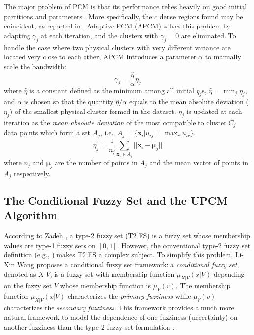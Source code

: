 \documentclass[journal]{IEEEtran}
\theoremstyle{definition}
\begin{document}
The major problem of PCM is that its performance relies heavily on good initial partitions and parameters \cite{nasraoui_improved_1996}. More specifically, the $c$ dense regions found may be coincident, as reported in \cite{barni_comments_1996}. Adaptive PCM (APCM) \cite{xenaki_novel_2016} solves this problem by adapting $\gamma_j$ at each iteration, and the clusters with $\gamma_j=0$ are eliminated. To handle the case where two physical clusters with very different variance are located very close to each other, APCM introduces a parameter $\alpha$ to manually scale the bandwidth:
\begin{equation}
\label{corrected_eta}
\gamma_j=\frac{\hat{\eta}}{\alpha}\eta_j
\end{equation}
where $\hat{\eta}$ is a constant defined as the minimum among all initial $\eta_j\text{s}$, $\hat{\eta}=\min_j\eta_j$, and $\alpha$ is chosen so that the quantity $\hat{\eta}/\alpha$ equals to the mean absolute deviation ($\eta_j$)  of the smallest physical cluster formed in the dataset.
$\eta_j$ is updated at each iteration as the \emph{mean absolute deviation} of the most compatible to cluster $C_j$ data points which form a set $A_j$, i.e., $A_j=\{\mathbf{x}_i|u_{ij}=\max_r u_{ir}\}$.
\begin{equation}
\label{apcm_eta_update}
\eta_j=\frac{1}{n_j}\sum_{\mathbf{x}_i\in A_j}||\mathbf{x}_i-\boldsymbol{\mu}_j||
\end{equation}
where $n_j$ and $\boldsymbol{\mu}_j$ are the number of points in $A_j$ and the mean vector of points in $A_j$ respectively.
\subsection{The Conditional Fuzzy Set and the UPCM Algorithm}
\label{sec-2-2}
According to Zadeh \cite{zadeh_concept_1975}, a type-2 fuzzy set (T2 FS) is a fuzzy set whose membership values are type-1 fuzzy sets on $[0,1]$. However, the conventional type-2 fuzzy set definition (e.g., \cite{mendel_type-2_2002}) makes T2 FS a complex subject. To simplify this problem, Li-Xin Wang \cite{wang_new_2016} proposes a conditional fuzzy set framework: a \emph{conditional fuzzy set}, denoted as $X|V$, is a fuzzy set with membership function $\mu_{X|V}(x|V)$ depending on the fuzzy set $V$ whose membership function is $\mu_V(v)$. The membership function $\mu_{X|V}(x|V)$ characterizes the \emph{primary fuzziness} while $\mu_V(v)$ characterizes the \emph{secondary fuzziness}. This framework provides a much more natural framework to model the dependence of one fuzziness (uncertainty) on another fuzziness than the type-2 fuzzy set formulation \cite{wang_new_2016}.
\end{document}
